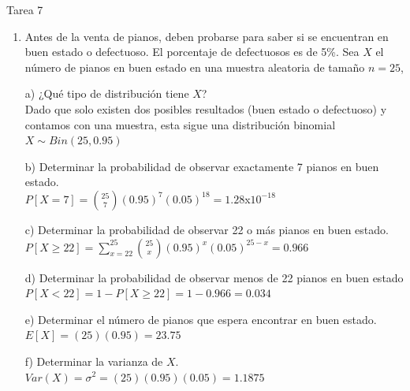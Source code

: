 \documentclass[a4paper, 12pt]{article}
\newcommand{\Aspace}{0.2cm}
\begin{document}
\newpage
\begin{center}
    { \LARGE Tarea 7}
\end{center}

\begin{enumerate}
    \item Antes de la venta de pianos, deben probarse para saber si se encuentran en buen estado o defectuoso. El porcentaje de defectuosos es de 5\%. Sea $X$ el número de pianos en buen estado en una muestra aleatoria de tamaño $n = 25$,
    \vspace{\Aspace} \par
    a) ¿Qué tipo de distribución tiene $X$?
    \\ { \color{azul} Dado que solo existen dos posibles resultados (buen estado o defectuoso) y contamos con una muestra, esta sigue una distribución binomial $X \sim Bin(25, 0{.}95)$ }

    \vspace{\Aspace} \par
    b) Determinar la probabilidad de observar exactamente 7 pianos en buen estado.
    \\ { \color{azul} $P[X = 7] = \binom{25}{7} (0{.}95)^{7} (0{.}05)^{18} = 1{.}28$x$10^{-18}$ }

    \vspace{\Aspace} \par
    c) Determinar la probabilidad de observar 22 o más pianos en buen estado.
    \\ { \color{azul} $P[X \geq 22] = \sum\limits_{x = 22}^{25} \binom{25}{x} (0{.}95)^{x} (0{.}05)^{25 - x} = 0{.}966$ }

    \vspace{\Aspace} \par
    d) Determinar la probabilidad de observar menos de 22 pianos en buen estado
    \\ { \color{azul} $P[X < 22] = 1 - P[X \geq 22] = 1 - 0{.}966 = 0{.}034$ }

    \vspace{\Aspace} \par
    e) Determinar el número de pianos que espera encontrar en buen estado.
    \\ { \color{azul} $E[X] = (25)(0{.}95) = 23{.}75$ }

    \vspace{\Aspace} \par
    f) Determinar la varianza de $X$.
    \\ { \color{azul} $Var(X) = \sigma^{2} = (25)(0{.}95)(0{.}05) = 1{.}1875$ }



\end{enumerate}
\end{document}
